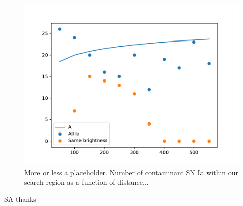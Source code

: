 \documentclass{aa}
\begin{document}
\begin{figure}[h]
\includegraphics[width=\linewidth]{plot.pdf}
\caption{More or less a placeholder. Number of contaminant SN Ia within our search region as a function of distance...
}
\label{fig:SNIa}
\end{figure}




\begin{acknowledgements}
 SA thanks
\end{acknowledgements}




\end{document}
